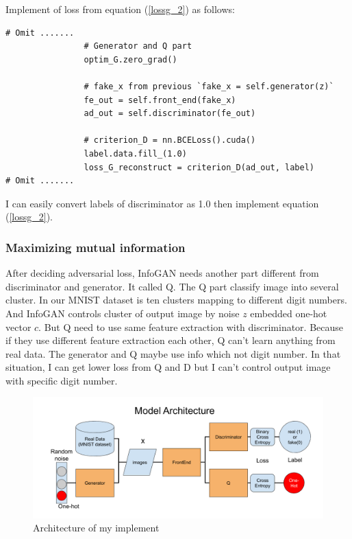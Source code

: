 \documentclass[12pt]{article}
\begin{document}
Implement of loss from equation (\ref{lossg_2}) as follows:

\begin{verbatim}
# Omit .......
                # Generator and Q part
                optim_G.zero_grad()
                
                # fake_x from previous `fake_x = self.generator(z)`
                fe_out = self.front_end(fake_x)
                ad_out = self.discriminator(fe_out)
                
                # criterion_D = nn.BCELoss().cuda()
                label.data.fill_(1.0)
                loss_G_reconstruct = criterion_D(ad_out, label)
# Omit .......
\end{verbatim}

I can easily convert labels of discriminator as 1.0 then implement equation (\ref{lossg_2}).

\subsubsection{Maximizing mutual information}

After deciding adversarial loss, InfoGAN needs another part different from discriminator and generator. It called Q. The Q part classify image into several cluster. In our MNIST dataset is ten clusters mapping to different digit numbers. And InfoGAN controls cluster of output image by  noise $z$ embedded one-hot vector $c$. But Q need to use same feature extraction with discriminator. Because if they use different feature extraction each other, Q can't learn anything from real data. The generator and Q maybe use info which not digit number. In that situation, I can get lower loss from Q and D but I can't control output image with specific digit number.

\begin{figure}[H]
\centering
\includegraphics[width=\linewidth]{Images/modelarch.png}
\caption{Architecture of my implement}
\end{figure}
\end{document}
